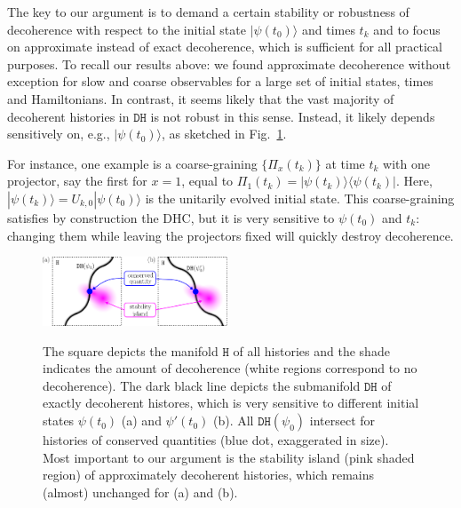 \documentclass[pre,onecolumn,12pt,aps,longbibliography,nofootinbib]{revtex4-2}
\newcommand{\rl}[0]{{\rangle\langle}}
\newcommand{\blue}[1]{#1}
\begin{document}
The \blue{key to our argument} is to demand a certain stability or robustness of decoherence with respect to the initial state $|\psi(t_0)\rangle$ and times $t_k$ \blue{and to focus on approximate instead of exact decoherence, which is sufficient for all practical purposes}. To \blue{recall our results above}: we found approximate decoherence without exception for slow and coarse observables for a large set of initial states, times and Hamiltonians. In contrast, it seems likely that the vast majority of decoherent histories in $\texttt{DH}$ is {not} robust in this sense. Instead, it likely depends sensitively on, e.g., $|\psi(t_0)\rangle$, as sketched in Fig.~\ref{fig set selection problem}.

For instance, one example is a coarse-graining $\{\Pi_x(t_k)\}$ at time $t_k$ with one projector, say the first for $x=1$, equal to $\Pi_{1}(t_k) = |\psi(t_k)\rl\psi(t_k)|$. Here, $|\psi(t_k)\rangle = U_{k,0}|\psi(t_0)\rangle$ is the unitarily evolved initial state. This coarse-graining satisfies by construction the DHC, but it is very sensitive to $\psi(t_0)$ and $t_k$: changing them while leaving the projectors fixed will quickly destroy decoherence.

\begin{figure}[t]
 \centering\includegraphics[width=0.49\textwidth,clip=true]{set_selection_problem.pdf}
 \label{fig set selection problem}\vspace{-0.5cm}
 \caption{The square depicts the manifold $\texttt{H}$ of all histories and the shade indicates the amount of decoherence (white regions correspond to no decoherence). The dark black line depicts the submanifold $\texttt{DH}$ of exactly decoherent histores, which is very sensitive to different initial states $\psi(t_0)$ (a) and $\psi'(t_0)$ (b). All $\texttt{DH}(\psi_0)$ intersect for histories of conserved quantities (blue dot, exaggerated in size). Most important to our argument is the stability island (pink shaded region) of approximately decoherent histories, which remains (almost) unchanged for (a) and (b). }
\end{figure}
\end{document}
